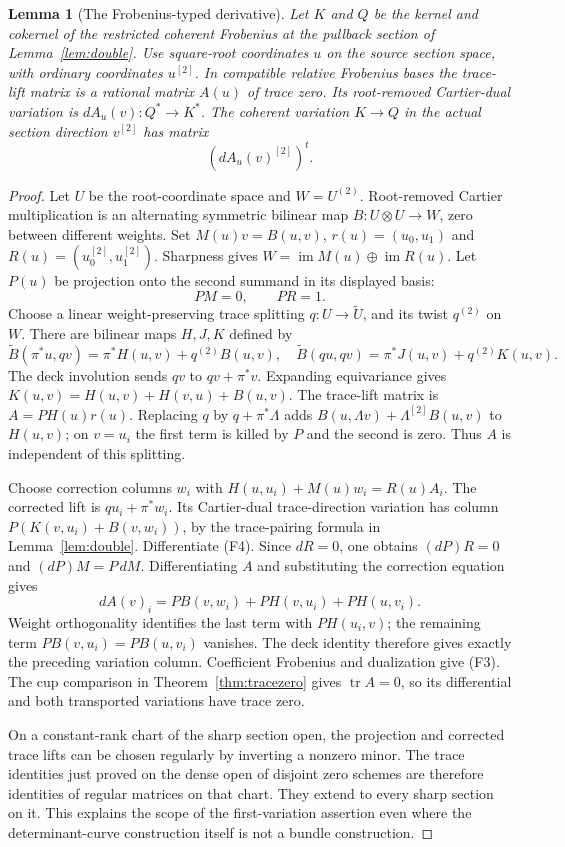 \documentclass[11pt]{article}
\newtheorem{lemma}[theorem]{Lemma}
\theoremstyle{definition}\newtheorem{definition}[theorem]{Definition}
\theoremstyle{remark}\newtheorem{remark}[theorem]{Remark}
\begin{document}
\begin{lemma}[The Frobenius-typed derivative]\label{lem:derivative}
Let $K$ and $Q$ be the kernel and cokernel of the restricted coherent Frobenius at the pullback section of Lemma~\ref{lem:double}. Use square-root coordinates $u$ on the source section space, with ordinary coordinates $u^{[2]}$. In compatible relative Frobenius bases the trace-lift matrix is a rational matrix $A(u)$ of trace zero. Its root-removed Cartier-dual variation is $dA_u(v):Q^*\to K^*$. The coherent variation $K\to Q$ in the actual section direction $v^{[2]}$ has matrix
\[
                            (dA_u(v)^{[2]})^t.            \tag{F3}
\]
\end{lemma}
\begin{proof}
Let $U$ be the root-coordinate space and $W=U^{(2)}$. Root-removed Cartier multiplication is an alternating symmetric bilinear map $B:U\otimes U\to W$, zero between different weights. Set $M(u)v=B(u,v)$,
$r(u)=(u_0,u_1)$ and $R(u)=(u_0^{[2]},u_1^{[2]})$.
Sharpness gives $W=\operatorname{im}M(u)\oplus\operatorname{im}R(u)$.
Let $P(u)$ be projection onto the second summand in its displayed basis:
\[
                         PM=0,\qquad PR=1.               \tag{F4}
\]
Choose a linear weight-preserving trace splitting $q:U\to\widetilde U$, and its twist $q^{(2)}$ on $W$. There are bilinear maps $H,J,K$ defined by
\[
 \widetilde B(\pi^*u,qv)=\pi^*H(u,v)+q^{(2)}B(u,v),\quad
 \widetilde B(qu,qv)=\pi^*J(u,v)+q^{(2)}K(u,v).
\]
The deck involution sends $qv$ to $qv+\pi^*v$. Expanding equivariance gives
$K(u,v)=H(u,v)+H(v,u)+B(u,v)$.
The trace-lift matrix is $A=PH(u)r(u)$. Replacing $q$ by $q+\pi^*\Lambda$ adds
$B(u,\Lambda v)+\Lambda^{[2]}B(u,v)$ to $H(u,v)$; on $v=u_i$ the first term is killed by $P$ and the second is zero. Thus $A$ is independent of this splitting.

Choose correction columns $w_i$ with
$H(u,u_i)+M(u)w_i=R(u)A_i$. The corrected lift is $qu_i+\pi^*w_i$. Its Cartier-dual trace-direction variation has column
$P(K(v,u_i)+B(v,w_i))$, by the trace-pairing formula in Lemma~\ref{lem:double}. Differentiate (F4). Since $dR=0$, one obtains
$(dP)R=0$ and $(dP)M=P\,dM$. Differentiating $A$ and substituting the correction equation gives
\[
 dA(v)_i=P B(v,w_i)+P H(v,u_i)+P H(u,v_i).
\]
Weight orthogonality identifies the last term with $PH(u_i,v)$; the remaining term $PB(v,u_i)=PB(u,v_i)$ vanishes. The deck identity therefore gives exactly the preceding variation column. Coefficient Frobenius and dualization give (F3). The cup comparison in Theorem~\ref{thm:tracezero} gives $\operatorname{tr}A=0$, so its differential and both transported variations have trace zero.

On a constant-rank chart of the sharp section open, the projection and corrected trace lifts can be chosen regularly by inverting a nonzero minor. The trace identities just proved on the dense open of disjoint zero schemes are therefore identities of regular matrices on that chart. They extend to every sharp section on it. This explains the scope of the first-variation assertion even where the determinant-curve construction itself is not a bundle construction.
\end{proof}
\end{document}
